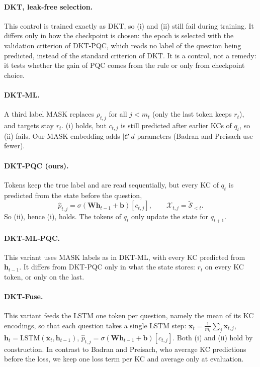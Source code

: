 \paragraph{DKT, leak-free selection.} This control is trained exactly as DKT, so (i) and (ii) still fail during training. It differs only in how the checkpoint is chosen: the epoch is selected with the validation criterion of DKT-PQC, which reads no label of the question being predicted, instead of the standard criterion of DKT. It is a control, not a remedy: it tests whether the gain of PQC comes from the rule or only from checkpoint choice.

\paragraph{DKT-ML.} A third label MASK replaces $\rho_{t,j}$ for all $j<m_t$ (only the last token keeps $r_t$), and targets stay $r_t$.
(i) holds, but $c_{t,j}$ is still predicted after earlier KCs of $q_t$, so (ii) fails.
Our MASK embedding adds $|\mathcal{C}|d$ parameters (Badran and Preisach use fewer).

\paragraph{DKT-PQC (ours).} Tokens keep the true label and are read sequentially, but every KC of $q_t$ is predicted from the state before the question,
\begin{equation}
  \hat p_{t,j}=\sigma(\mathbf{W}\mathbf{h}_{t-1}+\mathbf{b})[c_{t,j}],\qquad \mathcal{X}_{t,j}=\tilde{\mathcal{S}}_{<t}.
\end{equation}
So (ii), hence (i), holds. The tokens of $q_t$ only update the state for $q_{t+1}$.

\paragraph{DKT-ML-PQC.} This variant uses MASK labels as in DKT-ML, with every KC predicted from $\mathbf{h}_{t-1}$. It differs from DKT-PQC only in what the state stores: $r_t$ on every KC token, or only on the last.

\paragraph{DKT-Fuse.} This variant feeds the LSTM one token per question, namely the mean of its KC encodings, so that each question takes a single LSTM step: $\bar{\mathbf{x}}_t=\frac1{m_t}\sum_j\mathbf{x}_{t,j}$, $\mathbf{h}_t=\mathrm{LSTM}(\bar{\mathbf{x}}_t,\mathbf{h}_{t-1})$, $\hat p_{t,j}=\sigma(\mathbf{W}\mathbf{h}_{t-1}+\mathbf{b})[c_{t,j}]$. Both (i) and (ii) hold by construction. In contrast to Badran and Preisach, who average KC predictions before the loss, we keep one loss term per KC and average only at evaluation.

